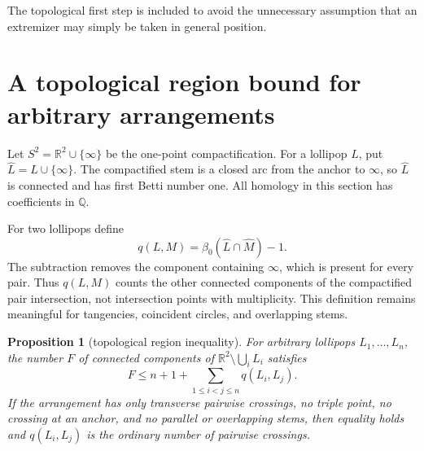 \documentclass[11pt]{article}
\theoremstyle{plain}
\newtheorem{proposition}[theorem]{Proposition}
\theoremstyle{definition}
\theoremstyle{remark}
\newcommand{\R}{\mathbb R}
\newcommand{\Q}{\mathbb Q}
\newcommand{\1}{\mathbf 1}
\newcommand{\betti}{\beta}
\begin{document}
The topological first step is included to avoid the unnecessary assumption
that an extremizer may simply be taken in general position.

\section{A topological region bound for arbitrary arrangements}\label{sec:topology}

Let $S^2=\R^2\cup\{\infty\}$ be the one-point compactification.  For a
lollipop $L$, put $\widehat L=L\cup\{\infty\}$.  The compactified stem is a
closed arc from the anchor to $\infty$, so $\widehat L$ is connected and has
first Betti number one.  All homology in this section has coefficients in
$\Q$.

For two lollipops define
\begin{equation}\label{eq:qdef}
 q(L,M)=\betti_0(\widehat L\cap\widehat M)-1.
\end{equation}
The subtraction removes the component containing $\infty$, which is present
for every pair.  Thus $q(L,M)$ counts the other connected components of the
compactified pair intersection, not intersection points with multiplicity.
This definition remains meaningful for tangencies, coincident circles, and
overlapping stems.

\begin{proposition}[topological region inequality]\label{prop:top-region}
For arbitrary lollipops $L_1,\ldots,L_n$, the number $F$ of connected
components of
$\R^2\setminus\bigcup_iL_i$ satisfies
\begin{equation}\label{eq:top-region}
 F\leq n+1+\sum_{1\leq i<j\leq n}q(L_i,L_j).
\end{equation}
If the arrangement has only transverse pairwise crossings, no triple point,
no crossing at an anchor, and no parallel or overlapping stems, then equality
holds and $q(L_i,L_j)$ is the ordinary number of pairwise crossings.
\end{proposition}
\end{document}
